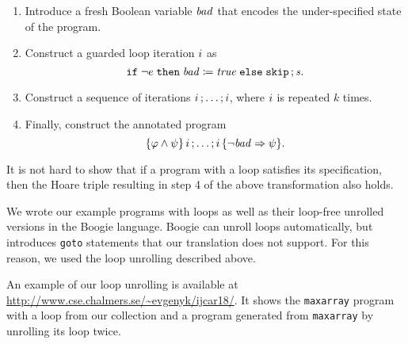 \begin{enumerate}
  \item Introduce a fresh Boolean variable $\mathit{bad}$ that encodes the under-specified state of the program.
  \item Construct a guarded loop iteration $i$ as $${\mathtt{if}\;{\neg e}\;\allowbreak\mathtt{then}\;{{\mathit{bad}}\coloneqq{\mathit{true}}}\;\allowbreak\mathtt{else}\;{\mathtt{skip}}}\,;{\mathit{s}}.$$
  \item Construct a sequence of iterations ${{i}\,;{\ldots}}\,;{i}$, where $i$ is repeated $k$ times. 
  \item Finally, construct the annotated program $$\{{\varphi \wedge \psi}\}\,{{{i}\,;{\ldots}}\,;{i}}\,\{{\neg\mathit{bad} \Rightarrow \psi}\}.$$
\end{enumerate}

It is not hard to show that if a program with a loop satisfies its specification, then the Hoare triple resulting in step 4 of the above transformation also holds. 

We wrote our example programs with loops as well as their loop-free unrolled versions in the Boogie language. Boogie can unroll loops automatically, but introduces \verb'goto' statements that our translation does not support. For this reason, we used the loop unrolling described above. 


An example of our loop unrolling is available at \url{http://www.cse.chalmers.se/~evgenyk/ijcar18/}. It shows the \texttt{maxarray} program with a loop from our collection and a program generated from \texttt{maxarray} by unrolling its loop twice.


